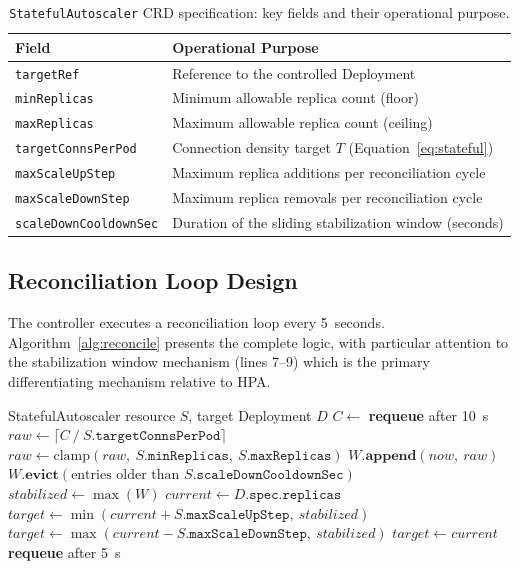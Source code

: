 \documentclass[twocolumn]{svjour3}
\begin{document}
\begin{table}[ht]
\centering
\caption{\texttt{StatefulAutoscaler} CRD specification: key fields and their operational purpose.}
\label{tab:crd}
\begin{tabular}{@{}lp{4.6cm}@{}}
\toprule
\rowcolor{gray!12}
\textbf{Field} & \textbf{Operational Purpose} \\
\midrule
\texttt{targetRef} & Reference to the controlled Deployment \\
\texttt{minReplicas} & Minimum allowable replica count (floor) \\
\texttt{maxReplicas} & Maximum allowable replica count (ceiling) \\
\texttt{targetConnsPerPod} & Connection density target $T$ (Equation~\ref{eq:stateful}) \\
\texttt{maxScaleUpStep} & Maximum replica additions per reconciliation cycle \\
\texttt{maxScaleDownStep} & Maximum replica removals per reconciliation cycle \\
\texttt{scaleDownCooldownSec} & Duration of the sliding stabilization window (seconds) \\
\bottomrule
\end{tabular}
\end{table}

\subsection{Reconciliation Loop Design}

The controller executes a reconciliation loop every 5~seconds. Algorithm~\ref{alg:reconcile} presents the complete logic, with particular attention to the stabilization window mechanism (lines 7--9) which is the primary differentiating mechanism relative to HPA.

\begin{algorithm}[ht]
\caption{\texttt{StatefulAutoscaler} Reconciliation Logic}
\label{alg:reconcile}
\begin{algorithmic}[1]
\Require StatefulAutoscaler resource $S$, target Deployment $D$
\State $C \gets$ 
    \State \textbf{requeue} after 10~s 
    \State \Return
\EndIf
\State $raw \gets \lceil C\ /\ S.\texttt{targetConnsPerPod} \rceil$
\State $raw \gets \text{clamp}(raw,\ S.\texttt{minReplicas},\ S.\texttt{maxReplicas})$
\State $W.\textbf{append}(now,\ raw)$ 
\State $W.\textbf{evict}(\text{entries older than } S.\texttt{scaleDownCooldownSec})$
\State $stabilized \gets \max(W)$ 
\State $current \gets D.\texttt{spec.replicas}$
    \State $target \gets \min(current + S.\texttt{maxScaleUpStep},\ stabilized)$
    \State $target \gets \max(current - S.\texttt{maxScaleDownStep},\ stabilized)$
\Else
    \State $target \gets current$
\EndIf
\State {}
\State \textbf{requeue} after 5~s
\end{algorithmic}
\end{algorithm}
\end{document}
